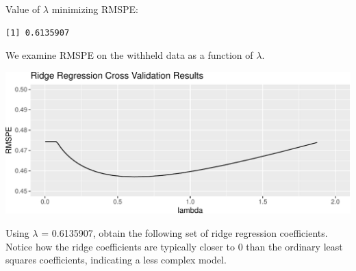 \documentclass[
  letterpaper,
  DIV=11,
  numbers=noendperiod]{scrreprt}
\newenvironment{Shaded}{\begin{snugshade}}{\end{snugshade}}
\newcommand{\AttributeTok}[1]{\textcolor[rgb]{0.40,0.45,0.13}{#1}}
\newcommand{\DecValTok}[1]{\textcolor[rgb]{0.68,0.00,0.00}{#1}}
\newcommand{\FunctionTok}[1]{\textcolor[rgb]{0.28,0.35,0.67}{#1}}
\newcommand{\NormalTok}[1]{\textcolor[rgb]{0.00,0.23,0.31}{#1}}
\newcommand{\OtherTok}[1]{\textcolor[rgb]{0.00,0.23,0.31}{#1}}
\newcommand{\SpecialCharTok}[1]{\textcolor[rgb]{0.37,0.37,0.37}{#1}}
\newcommand{\StringTok}[1]{\textcolor[rgb]{0.13,0.47,0.30}{#1}}
\begin{document}
Value of \(\lambda\) minimizing RMSPE:

\begin{Shaded}
\end{Shaded}

\begin{verbatim}
[1] 0.6135907
\end{verbatim}

We examine RMSPE on the withheld data as a function of \(\lambda\).

\includegraphics{Ch7_files/figure-pdf/unnamed-chunk-41-1.pdf}

Using \(\lambda\) = 0.6135907, obtain the following set of ridge
regression coefficients. Notice how the ridge coefficients are typically
closer to 0 than the ordinary least squares coefficients, indicating a
less complex model.

\begin{Shaded}
\end{Shaded}
\end{document}
